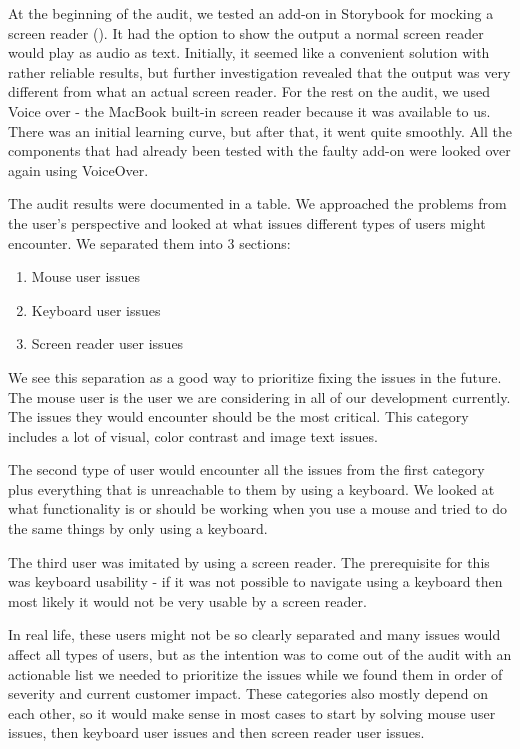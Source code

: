 \documentclass{master_thesis}
\begin{document}
At the beginning of the audit, we tested an add-on in Storybook for mocking a screen reader (). It had the option to show the output a normal screen reader would play as audio as text. Initially, it seemed like a convenient solution with rather reliable results, but further investigation revealed that the output was very different from what an actual screen reader. For the rest on the audit, we used Voice over - the MacBook built-in screen reader because it was available to us. There was an initial learning curve, but after that, it went quite smoothly. All the components that had already been tested with the faulty add-on were looked over again using VoiceOver.

The audit results were documented in a table. We approached the problems from the user's perspective and looked at what issues different types of users might encounter. We separated them into 3 sections:
\begin{enumerate}
	\item Mouse user issues
	\item Keyboard user issues
	\item Screen reader user issues
\end{enumerate}

We see this separation as a good way to prioritize fixing the issues in the future. The mouse user is the user we are considering in all of our development currently. The issues they would encounter should be the most critical. This category includes a lot of visual, color contrast and image text issues.

The second type of user would encounter all the issues from the first category plus everything that is unreachable to them by using a keyboard. We looked at what functionality is or should be working when you use a mouse and tried to do the same things by only using a keyboard.

The third user was imitated by using a screen reader. The prerequisite for this was keyboard usability - if it was not possible to navigate using a keyboard then most likely it would not be very usable by a screen reader.

In real life, these users might not be so clearly separated and many issues would affect all types of users, but as the intention was to come out of the audit with an actionable list we needed to prioritize the issues while we found them in order of severity and current customer impact. These categories also mostly depend on each other, so it would make sense in most cases to start by solving mouse user issues, then keyboard user issues and then screen reader user issues.
\end{document}
